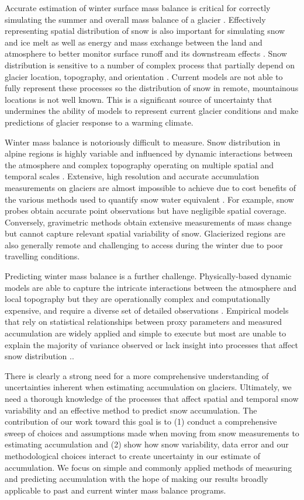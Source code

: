 \documentclass[review,oneside, letterpaper]{igs}
\begin{document}
Accurate estimation of winter surface mass balance is critical for correctly simulating the summer and overall mass balance of a glacier \citep{Reveillet2016}. Effectively representing spatial distribution of snow is also important for simulating snow and ice melt as well as energy and mass exchange between the land and atmosphere to better monitor surface runoff and its downstream effects \citep{Clark2011}. Snow distribution is sensitive to a number of complex process that partially depend on glacier location, topography, and orientation \citep{Bloschl1991, Mott2008, Clark2011, Sold2013}. Current models are not able to fully represent these processes so the distribution of snow in remote, mountainous locations is not well known. This is a significant source of uncertainty that undermines the ability of models to represent current glacier conditions and make predictions of glacier response to a warming climate. 

Winter mass balance is notoriously difficult to measure. Snow distribution in alpine regions is highly variable and influenced by dynamic interactions between the atmosphere and complex topography operating on multiple spatial and temporal scales \citep{Liston2006}. Extensive, high resolution and accurate accumulation measurements on glaciers are almost impossible to achieve due to cost benefits of the various methods used to quantify snow water equivalent \citep{McGrath2015}. For example, snow probes obtain accurate point observations but have negligible spatial coverage. Conversely, gravimetric methods obtain extensive measurements of mass change but cannot capture relevant spatial variability of snow. Glacierized regions are also generally remote and challenging to access during the winter due to poor travelling conditions. 

Predicting winter mass balance is a further challenge. Physically-based dynamic models are able to capture the intricate interactions between the atmosphere and local topography but they are operationally complex and computationally expensive, and require a diverse set of detailed observations \citep{Dadic2010}. Empirical models that rely on statistical relationships between proxy parameters and measured accumulation are widely applied and simple to execute but most are unable to explain the majority of variance observed or lack insight into processes that affect snow distribution \citep[e.g.][]{Grabiec2011,Lopez2011}..

There is clearly a strong need for a more comprehensive understanding of uncertainties inherent when estimating accumulation on glaciers. Ultimately, we need a thorough knowledge of the processes that affect spatial and temporal snow variability and an effective method to predict snow accumulation. The contribution of our work toward this goal is to (1) conduct a comprehensive sweep of choices and assumptions made when moving from snow measurements to estimating accumulation and (2) show how snow variability, data error and our methodological choices interact to create uncertainty in our estimate of accumulation. We focus on simple and commonly applied methods of measuring and predicting accumulation with the hope of making our results broadly applicable to past and current winter mass balance programs.
\end{document}
